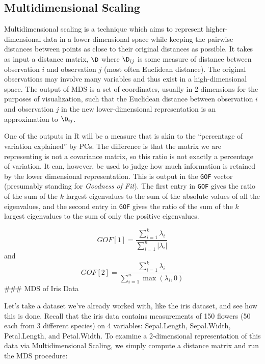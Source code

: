 \documentclass[
]{article}
\newenvironment{Shaded}{\begin{snugshade}}{\end{snugshade}}
\newcommand{\AttributeTok}[1]{\textcolor[rgb]{0.77,0.63,0.00}{#1}}
\newcommand{\CommentTok}[1]{\textcolor[rgb]{0.56,0.35,0.01}{\textit{#1}}}
\newcommand{\ConstantTok}[1]{\textcolor[rgb]{0.00,0.00,0.00}{#1}}
\newcommand{\DecValTok}[1]{\textcolor[rgb]{0.00,0.00,0.81}{#1}}
\newcommand{\FunctionTok}[1]{\textcolor[rgb]{0.00,0.00,0.00}{#1}}
\newcommand{\NormalTok}[1]{#1}
\newcommand{\OtherTok}[1]{\textcolor[rgb]{0.56,0.35,0.01}{#1}}
\newcommand{\SpecialCharTok}[1]{\textcolor[rgb]{0.00,0.00,0.00}{#1}}
\theoremstyle{definition}
\theoremstyle{definition}
\theoremstyle{definition}
\theoremstyle{definition}
\theoremstyle{remark}
\begin{document}
\hypertarget{multidimensional-scaling}{%
\subsection{Multidimensional Scaling}\label{multidimensional-scaling}}

Multidimensional scaling is a technique which aims to represent higher-dimensional data in a lower-dimensional space while keeping the pairwise distances between points as close to their original distances as possible. It takes as input a distance matrix, \(\D\) where \(\D_{ij}\) is some measure of distance between observation \(i\) and observation \(j\) (most often Euclidean distance). The original observations may involve many variables and thus exist in a high-dimensional space. The output of MDS is a set of coordinates, usually in 2-dimensions for the purposes of visualization, such that the Euclidean distance between observation \(i\) and observation \(j\) in the new lower-dimensional representation is an approximation to \(\D_{ij}\).

One of the outputs in R will be a measure that is akin to the ``percentage of variation explained'' by PCs. The difference is that the matrix we are representing is not a covariance matrix, so this ratio is not exactly a percentage of variation. It can, however, be used to judge how much information is retained by the lower dimensional representation. This is output in the \texttt{GOF} vector (presumably standing for \emph{Goodness of Fit}). The first entry in \texttt{GOF} gives the ratio of the sum of the \(k\) largest eigenvalues to the sum of the absolute values of all the eigenvalues, and the second entry in \texttt{GOF} gives the ratio of the sum of the \(k\) largest eigenvalues to the sum of only the positive eigenvalues.

\[GOF[1] = \frac{\sum_{i=1}^k \lambda_i}{\sum_{i=1}^n |\lambda_i|}\]
and
\[GOF[2] = \frac{\sum_{i=1}^k \lambda_i}{\sum_{i=1}^n \max(\lambda_i,0)}\]
\#\#\# MDS of Iris Data

Let's take a dataset we've already worked with, like the iris dataset, and see how this is done. Recall that the iris data contains measurements of 150 flowers (50 each from 3 different species) on 4 variables: Sepal.Length, Sepal.Width, Petal.Length, and Petal.Width. To examine a 2-dimensional representation of this data via Multidimensional Scaling, we simply compute a distance matrix and run the MDS procedure:

\begin{Shaded}
\end{Shaded}
\end{document}
